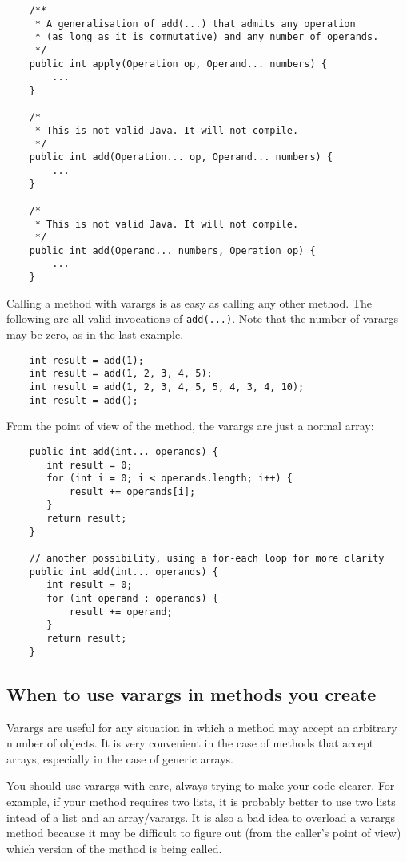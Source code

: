 \begin{verbatim}
    /** 
     * A generalisation of add(...) that admits any operation 
     * (as long as it is commutative) and any number of operands. 
     */
    public int apply(Operation op, Operand... numbers) {
        ...
    }

    /*
     * This is not valid Java. It will not compile. 
     */
    public int add(Operation... op, Operand... numbers) {
        ...
    }

    /*
     * This is not valid Java. It will not compile. 
     */
    public int add(Operand... numbers, Operation op) {
        ...
    }
\end{verbatim}

Calling a method with varargs is as easy as calling any other
method. The following are all valid invocations of
\verb+add(...)+. Note that the number of varargs may be zero, as in the
last example. 

\begin{verbatim}
    int result = add(1);
    int result = add(1, 2, 3, 4, 5);
    int result = add(1, 2, 3, 4, 5, 5, 4, 3, 4, 10);
    int result = add();
\end{verbatim}

From the point of view of the method, the varargs are just a normal
array: 

\begin{verbatim}
    public int add(int... operands) {
       int result = 0;
       for (int i = 0; i < operands.length; i++) {
           result += operands[i];
       } 
       return result;
    }

    // another possibility, using a for-each loop for more clarity
    public int add(int... operands) {
       int result = 0;
       for (int operand : operands) {
           result += operand;
       } 
       return result;
    }
\end{verbatim}

\subsection{When to use varargs in methods you create}
\label{sec:when-use-varargs}

Varargs are useful for any situation in which a method may accept an
arbitrary number of objects. It is very convenient in the case
of methods that accept arrays, especially in the case of generic
arrays. 

You should use varargs with care, always trying to make your code
clearer. For example, if your method requires two lists, it is
probably better to use two lists intead of a list and an
array/varargs. It is also a bad idea to overload a varargs method
because it may be difficult to figure out (from the caller's point of
view) which version of the method is being called. 